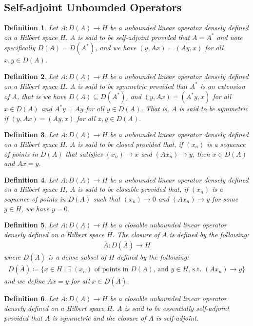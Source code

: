 \documentclass[11pt]{book}
\theoremstyle{break}
\theoremstyle{break}
\newtheorem{defn}{Definition}[corL]
\begin{document}
\subsection{Self-adjoint Unbounded Operators}
\begin{defn}
Let $A:D(A)\to H$ be a unbounded linear operator densely defined on a Hilbert space $H$. $A$ is said to be self-adjoint provided that $A = A^*$ and note specifically $D(A) = D(A^*)$, and we have $(y,Ax) = (Ay,x)$ for all $x,y \in D(A)$. 
\end{defn}
\begin{defn}
Let $A:D(A)\to H$ be a unbounded linear operator densely defined on a Hilbert space $H$. $A$ is said to be symmetric provided that $A^*$ is an extension of $A$, that is we have $D(A) \subseteq D(A^*)$, and $(y,Ax) = (A^*y,x)$ for all $x \in D(A)$ and $A^*y = Ay$ for all $y \in D(A)$. That is, $A$ is said to be symmetric if $(y,Ax) = (Ay,x)$ for all $x,y \in D(A)$. 
\end{defn}
\begin{defn}
Let $A:D(A)\to H$ be a unbounded linear operator densely defined on a Hilbert space $H$. $A$ is said to be closed provided that, if $(x_n)$ is a sequence of points in $D(A)$ that satisfies $(x_n)\to x$ and $(Ax_n) \to y$, then $x\in D(A)$ and $Ax = y$. 
\end{defn}
\begin{defn}
Let $A:D(A)\to H$ be a unbounded linear operator densely defined on a Hilbert space $H$, $A$ is said to be closable provided that, if $(x_n)$ is a sequence of points in $D(A)$ such that $(x_n) \to 0$ and $(Ax_n) \to y$ for some $y \in H$, we have $y =0 $. 
\end{defn}
\begin{defn}
Let $A:D(A)\to H$ be a closable unbounded linear operator densely defined on a Hilbert space $H$. The closure of $A$ is defined by the following:
\begin{align*}
\bar{A} : D(\bar{A}) \to H
\end{align*}
where $D(\bar{A})$ is a dense subset of $H$ defined by the following:
\begin{align*}
D(\bar{A}) \coloneqq \{ x \in H \mid \exists\ (x_n) \text{ of points in }D(A)\text{, and }y \in H \text{, s.t. } (Ax_n) \to y \}
\end{align*}
and we define $\bar{A}x = y$ for all $x \in D(\bar{A})$. 
\end{defn}
\begin{defn}
Let $A:D(A)\to H$ be a closable unbounded linear operator densely defined on a Hilbert space $H$. $A$ is said to be essentially self-adjoint provided that $A$ is symmetric and the closure of $A$ is self-adjoint.
\end{defn}
\end{document}
